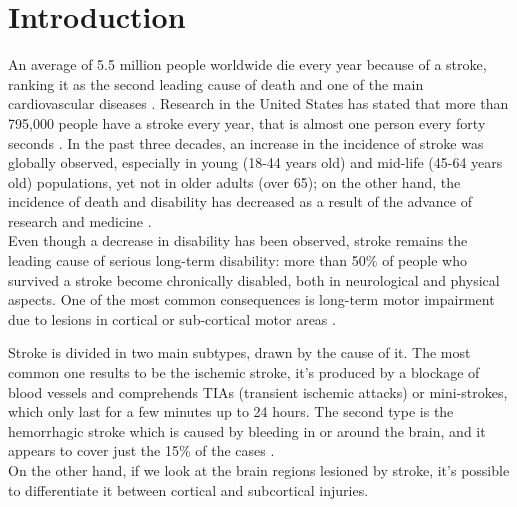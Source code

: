 \chapter{Introduction}
An average of 5.5 million people worldwide die every year because of a stroke, ranking it as the second leading cause of death and one of the main cardiovascular diseases \parencite{Donkor_2018}. Research in the United States has stated that more than 795,000 people have a stroke every year, that is almost one person every forty seconds \parencite{Tsao_2023}. In the past three decades, an increase in the incidence of stroke was globally observed, especially in young (18-44 years old) and mid-life (45-64 years old) populations, yet not in older adults (over 65); on the other hand, the incidence of death and disability has decreased as a result of the advance of research and medicine \parencite{Yahya_2020}. \\
Even though a decrease in disability has been observed, stroke remains the leading cause of serious long-term disability: more than 50\% of people who survived a stroke become chronically disabled, both in neurological and physical aspects. One of the most common consequences is long-term motor impairment due to lesions in cortical or sub-cortical motor areas \parencite{Karthikeyan_2019}. 

Stroke is divided in two main subtypes, drawn by the cause of it. The most common one results to be the ischemic stroke, it's produced by a blockage of blood vessels and comprehends TIAs (transient ischemic attacks) or mini-strokes, which only last for a few minutes up to 24 hours. The second type is the hemorrhagic stroke which is caused by bleeding in or around the brain, and it appears to cover just the 15\% of the cases \parencite{Abdu_2021}. \\
On the other hand, if we look at the brain regions lesioned by stroke, it's possible to differentiate it between cortical and subcortical injuries. 

